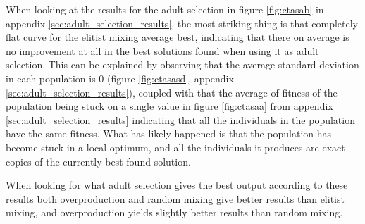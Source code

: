 When looking at the results for the adult selection in figure \ref{fig:ctasab} in appendix \ref{sec:adult_selection_results}, the most striking thing is that completely flat curve for the elitist mixing average best, indicating that there on average is no improvement at all in the best solutions found when using it as adult selection. This can be explained by observing that the average standard deviation in each population is 0 (figure \ref{fig:ctasasd}, appendix \ref{sec:adult_selection_results}), coupled with that the average of fitness of the population being stuck on a single value in figure \ref{fig:ctasaa} from appendix \ref{sec:adult_selection_results} indicating that all the individuals in the population have the same fitness. What has likely happened is that the population has become stuck in a local optimum, and all the individuals it produces are exact copies of the currently best found solution.

When looking for what adult selection gives the best output according to these results both overproduction and random mixing give better results than elitist mixing, and overproduction yields slightly better results than random mixing.




